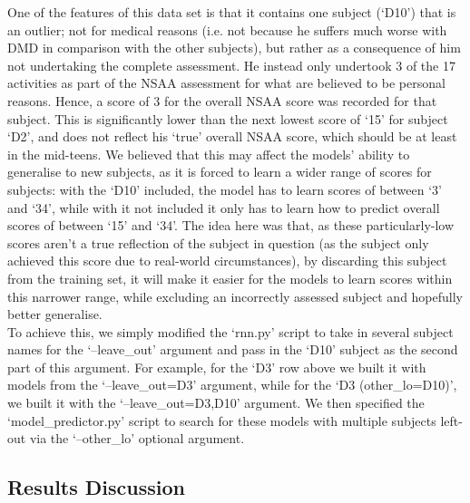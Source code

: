 \documentclass[12pt,twoside]{report}
\begin{document}
\quad 	One of the features of this data set is that it contains one subject (‘D10’) that is an outlier; not for medical reasons (i.e. not because he suffers much worse with DMD in comparison with the other subjects), but rather as a consequence of him not undertaking the complete assessment. He instead only undertook 3 of the 17 activities as part of the NSAA assessment for what are believed to be personal reasons. Hence, a score of 3 for the overall NSAA score was recorded for that subject. This is significantly lower than the next lowest score of ‘15’ for subject ‘D2’, and does not reflect his ‘true’ overall NSAA score, which should be at least in the mid-teens. We believed that this may affect the models’ ability to generalise to new subjects, as it is forced to learn a wider range of scores for subjects: with the ‘D10’ included, the model has to learn scores of between ‘3’ and ‘34’, while with it not included it only has to learn how to predict overall scores of between ‘15’ and ‘34’. The idea here was that, as these particularly-low scores aren’t a true reflection of the subject in question (as the subject only achieved this score due to real-world circumstances), by discarding this subject from the training set, it will make it easier for the models to learn scores within this narrower range, while excluding an incorrectly assessed subject and hopefully better generalise.\\

\quad 	To achieve this, we simply modified the ‘rnn.py’ script to take in several subject names for the ‘--leave\_out’ argument and pass in the ‘D10’ subject as the second part of this argument. For example, for the ‘D3’ row above we built it with models from the ‘--leave\_out=D3’ argument, while for the ‘D3 (other\_lo=D10)’, we built it with the ‘--leave\_out=D3,D10’ argument. We then specified the ‘model\_predictor.py’ script to search for these models with multiple subjects left-out via the ‘--other\_lo’ optional argument.


\subsection{Results Discussion}
\end{document}
